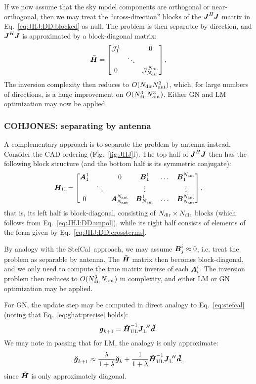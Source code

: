 \documentclass[useAMS,usenatbib]{mn2e}
\makeatletter
\newcommand{\mat}[1]{{\bmath{#1}}}
\newcommand{\JJ}{\mat{J}} %
\newcommand{\HH}{\mat{H}} %
\newcommand{\HHa}{\mat{\tilde{H}}} %
\newcommand{\JHJ}{\JJ^H\JJ} %
\newcommand{\Matrix}[2]{\left [ \begin{array}{@{}#1@{}}#2\end{array} \right ]}
\newcommand{\AUG}[1]{\bmath{\breve{#1}}}
\newcommand{\Gg}{\AUG{g}}
\newcommand{\Dd}{\AUG{d}}
\newcommand{\TOP}{\mathrm{U}}%
\newcommand{\LEFT}{\mathrm{L}}
\newcommand{\UL}{\mathrm{UL}}%
\newcommand{\StefCal}{{\sc StefCal}}
\numberwithin{equation}{section} %
\makeatother
\begin{document}
If we now assume that the sky model components are orthogonal or near-orthogonal, then 
we may treat the ``cross-direction'' blocks of the $\JHJ$ matrix in Eq.~\ref{eq:JHJ:DD:blocked} as null. The problem is 
then separable by direction, and $\JHJ$ is approximated by a block-diagonal matrix:
\begin{equation}
\label{eq:JHJ:DD:block-diag}
\HHa = \Matrix{ccc}{\JJJ^1_1 &  & 0 \\
& \ddots &  \\
0 & & \JJJ_{\Nd}^{\Nd} },
\end{equation}
The inversion complexity then reduces to $O(N_\mathrm{dir}N_\mathrm{ant}^3)$, which, for large numbers of directions, is a huge improvement on 
$O(N_\mathrm{dir}^3N_\mathrm{ant}^3)$. Either GN and LM optimization may now be applied. 

\newcommand{\JJX}{\bmath{A}}
\newcommand{\JJY}{\bmath{B}}

\subsubsection{COHJONES: separating by antenna}

A complementary approach is to separate the problem by antenna instead. Consider the CAD ordering (Fig.~\ref{fig:JHJ}f). 
The top half of $\JHJ$ then has the following block structure (and the bottom half is its symmetric conjugate):
\begin{equation}
\label{eq:JHJ:DD:blocked-ant}
\HH_\TOP = \Matrix{cccccc}{\JJX^1_1 &  & 0 & \JJY^1_1 & \dots & \JJY^{\Na}_1 \\
 & \ddots &  & \vdots & & \vdots \\
0 &  & \JJX_{\Na}^{\Na} & \JJY_{\Na}^1 & \dots & \JJY_{\Na}^{\Na} },
\end{equation}
that is, its left half is block-diagonal, consisting of $N_\mathrm{dir}\times N_\mathrm{dir}$ blocks (which follows
from Eq.~\ref{eq:JHJ:DD:unpol}), while its right half consists of elements of the form given by
Eq.~\ref{eq:JHJ:DD:crossterms}. 

By analogy with the \StefCal\ approach, we may assume $\JJY^i_j \approx 0$, i.e. treat the problem as
separable by antenna. The $\HHa$ matrix then becomes block-diagonal, and we only need to compute the 
true matrix inverse of each $\JJX^i_i$. The inversion problem then reduces to $O(N_\mathrm{dir}^3N_\mathrm{ant})$ in complexity,
and either LM or GN optimization may be applied.

For GN, the update step may be computed in direct analogy to Eq.~\ref{eq:stefcal} (noting that Eq.~\ref{eq:ghat:precise}
holds):
\begin{equation}
\bmath{g}_{k+1} = \HHa_\UL^{-1} \JJ_\LEFT^{~H} \Dd.
\end{equation}
We may note in passing that for LM, the analogy is only approximate:
\begin{equation}
\Gg_{k+1} \approx \frac{\lambda}{1+\lambda}\Gg_k + \frac{1}{1+\lambda} \HHa_\UL^{-1} \JJ_\LEFT^{~H} \Dd,
\end{equation}
since $\HHa$ is only approximately diagonal.
\end{document}
